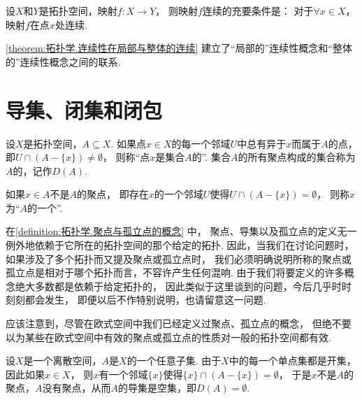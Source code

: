 \begin{theorem}\label{theorem:拓扑学.连续性在局部与整体的连续}
设\(X\)和\(Y\)是拓扑空间，映射\(f\colon X \to Y\)，
则映射\(f\)连续的充要条件是：
对于\(\forall x \in X\)，映射\(f\)在点\(x\)处连续.
\end{theorem}

\cref{theorem:拓扑学.连续性在局部与整体的连续}
建立了“局部的”连续性概念和“整体的”连续性概念之间的联系.

\section{导集、闭集和闭包}
\begin{definition}\label{definition:拓扑学.聚点与孤立点的概念}
设\(X\)是拓扑空间，\(A \subseteq X\).
如果点\(x \in X\)的每一个邻域\(U\)中总有异于\(x\)而属于\(A\)的点，
即\(U \cap (A - \{x\}) \neq \emptyset\)，
则称“点\(x\)是集合\(A\)的”.
集合\(A\)的所有聚点构成的集合称为\(A\)的，记作\(D(A)\).

如果\(x \in A\)不是\(A\)的聚点，
即存在\(x\)的一个邻域\(U\)使得\(U \cap (A - \{x\}) = \emptyset\)，
则称\(x\)为“\(A\)的一个”.
\end{definition}

在\cref{definition:拓扑学.聚点与孤立点的概念} 中，
聚点、导集以及孤立点的定义无一例外地依赖于它所在的拓扑空间的那个给定的拓扑.
因此，当我们在讨论问题时，
如果涉及了多个拓扑而又提及聚点或孤立点时，
我们必须明确说明所称的聚点或孤立点是相对于哪个拓扑而言，不容许产生任何混响.
由于我们将要定义的许多概念绝大多数都是依赖于给定拓扑的，
因此类似于这里谈到的问题，今后几乎时时刻刻都会发生，
即便以后不作特别说明，也请留意这一问题.

应该注意到，尽管在欧式空间中我们已经定义过聚点、孤立点的概念，
但绝不要以为某些在欧式空间中有效的聚点或孤立点的性质对一般的拓扑空间都有效.

\begin{example}[离散空间中的聚点]\label{example:拓扑学.离散空间中的聚点}
设\(X\)是一个离散空间，\(A\)是\(X\)的一个任意子集.
由于\(X\)中的每一个单点集都是开集，因此如果\(x \in X\)，
则\(x\)有一个邻域\(\{x\}\)使得\(\{x\}\cap(A-\{x\})=\emptyset\)，
于是\(x\)不是\(A\)的聚点，\(A\)没有聚点，从而\(A\)的导集是空集，即\(D(A)=\emptyset\).
\end{example}

